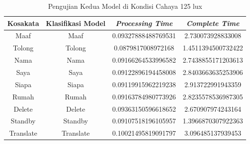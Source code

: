 \begin{longtable}{|c|c|c|c|}
  \caption{Pengujian Kedua Model di Kondisi Cahaya 125 lux}
  \label{tb:prediksiterang2}                                   \\
  \hline
  \rowcolor[HTML]{C0C0C0}
  \textbf{Kosakata} & \textbf{Klasifikasi Model} & \textbf{\emph{Processing Time}} & \textbf{\emph{Complete Time}}\\
  \hline
  Maaf              & Maaf                        & 0.09327888488769531                           & 2.730073928833008                                  \\
  Tolong            & Tolong                        & 0.0879817008972168                           & 1.4511394500732422                                  \\
  Nama              & Nama                        & 0.09166264533996582                           & 2.7438855171203613                                  \\
  Saya              & Saya                        & 0.09122896194458008                           & 2.8403663635253906                                  \\
  Siapa              & Siapa                        & 0.09119915962219238                           & 2.913722991943359                                  \\
  Rumah             & Rumah                        & 0.09163784980773926                           & 2.8235578536987305                                  \\
  Delete            & Delete                        & 0.09363150596618652                           & 2.670907974243164                                  \\
  Standby           & Standby                        & 0.09107518196105957                           & 1.3966870307922363                                  \\
  Translate         & Translate                        & 0.10021495819091797                           & 3.096485137939453                                  \\
  \hline
\end{longtable}

